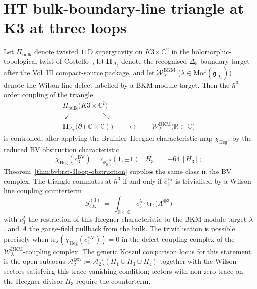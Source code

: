 \section{HT bulk-boundary-line triangle at K3 at three loops}
\label{sec:htbb-core-3loop-triangle-K3}

\begin{theorem}
\label{thm:htbb-core-3loop-triangle}
Let $\Pi_{\mathrm{bulk}}$ denote twisted $11$D supergravity on
$K3\times\mathbb{C}^2$ in the holomorphic-topological twist of
Costello~\cite{Costello2017M5}, let
$\mathbf{H}_{\Delta_5}$ denote the recognised $\Delta_5$ boundary target
after the Vol~III compact-source package, and let
$\mathcal{W}^{\mathrm{BKM}}_\lambda$
($\lambda\in\mathrm{Mod}(\mathfrak{g}_{\Delta_5})$)
denote the Wilson-line defect labelled by a BKM module target. Then the
$\hbar^3$-order coupling of the triangle
\[
\begin{array}{c}
 \Pi_{\mathrm{bulk}}\bigl(K3\times\mathbb{C}^2\bigr) \\
 \swarrow \qquad\qquad \searrow \\
 \mathbf{H}_{\Delta_5}\bigl(\partial(\mathbb{C}\times\mathbb{C})\bigr)
 \qquad\longleftrightarrow\qquad
 \mathcal{W}^{\mathrm{BKM}}_\lambda\bigl(\mathbb{R}\subset\mathbb{C}\bigr)
\end{array}
\]
is controlled, after applying the Bruinier--Heegner characteristic map
\(\chi_{\mathrm{Heg}}\), by the reduced BV obstruction characteristic
\[
	 \chi_{\mathrm{Heg}}(c^{\mathrm{BV}}_3)
	 = c_{\phi_{0,1}^{K3}}(1,\pm1)\,[H_3]
	 = -64\,[H_3];
\]
Theorem~\ref{thm:bvbrst-3loop-obstruction} supplies the same class in
the BV complex. The triangle commutes
at $\hbar^3$ if and only if $c^{\mathrm{Br}}_3$ is trivialised by a Wilson-line
coupling counterterm
\[
 S^{(3)}_{\mathrm{c.t.}}
 \;=\;
 \int_{\mathbb{R}\subset\mathbb{C}}
 c_3^{\lambda}\cdot\mathrm{tr}_{\lambda}\bigl(A^{\otimes 3}\bigr)
\]
with $c_3^{\lambda}$ the restriction of this Heegner characteristic to
the BKM module target \(\lambda\), and $A$ the gauge-field pullback from the bulk. The
trivialisation is possible precisely when
$\mathrm{tr}_\lambda(\chi_{\mathrm{Heg}}(c^{\mathrm{BV}}_3)) = 0$ in
the defect coupling complex of the
$\mathcal{W}^{\mathrm{BKM}}_\lambda$-coupling
complex. The generic Koszul comparison locus for this statement is
the open sublocus
$\mathcal{A}_2^{\mathrm{gen}} :=
\overline{\mathcal{A}_2}\setminus(H_1\cup H_3\cup H_4)$ together with
the Wilson sectors satisfying this trace-vanishing condition; sectors
with non-zero trace on the Heegner divisor $H_3$ require the
counterterm.
\end{theorem}

